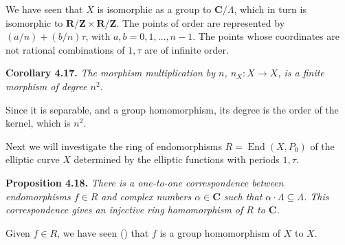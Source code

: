 {\Proof We have seen that $X$ is isomorphic as a group to $\mathbf C/\Lambda$, which in turn is isomorphic to $\mathbf R/\mathbf Z\times\mathbf R/\mathbf Z$. The points of order  are represented by $(a/n)+(b/n)\tau$, with $a,b=0,1,\ldots,n-1$. The points whose coordinates are not rational combinations of $1,\tau$ are of infinite order.

\medskip
\noindent\hypertarget{result-IV-4.17}{}\textbf{Corollary 4.17.} \emph{The morphism multiplication by $n$\EditionText{}, $n_X\colon X\to X$, is a finite morphism of degree $n^2$.}

\Proof Since it is separable, and a group homomorphism, its degree is the order of the kernel, which is $n^2$.

\smallskip
Next we will investigate the ring of endomorphisms $R=\operatorname{End}(X,P_0)$ of the elliptic curve $X$ determined by the elliptic functions with periods $1,\tau$.

\medskip
\noindent\hypertarget{result-IV-4.18}{}\textbf{Proposition 4.18.} \emph{There is a one-to-one correspondence between endomorphisms $f\in R$ and complex numbers $\alpha\in\mathbf C$ such that $\alpha\cdot\Lambda\subseteq\Lambda$. This correspondence gives an injective ring homomorphism of $R$ to $\mathbf C$.}

\Proof Given $f\in R$, we have seen () that $f$ is a group homomorphism of $X$ to $X$. 
}
